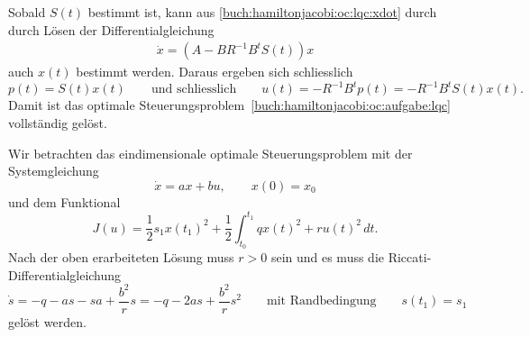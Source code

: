 Sobald $S(t)$ bestimmt ist, kann aus
\eqref{buch:hamiltonjacobi:oc:lqc:xdot}
durch durch Lösen der Differentialgleichung 
\begin{align*}
\dot{x} = (A-BR^{-1}B^tS(t)) x
\end{align*}
auch $x(t)$ bestimmt werden.
Daraus ergeben sich schliesslich
\[
p(t)
=
S(t)x(t)
\qquad
\text{und schliesslich}
\qquad
u(t)
=
-R^{-1}B^tp(t)=-R^{-1}B^tS(t)x(t).
\]
Damit ist das optimale
Steuerungsproblem~\ref{buch:hamiltonjacobi:oc:aufgabe:lqc}
vollständig gelöst.

\begin{beispiel}
Wir betrachten das eindimensionale optimale Steuerungsproblem mit
der Systemgleichung
\[
\dot x
=
ax + bu,
\qquad
x(0)=x_0
\]
und dem Funktional
\[
J(u)
=
\frac12 s_1x(t_1)^2
+
\frac12
\int_{t_0}^{t_1}
qx(t)^2 + ru(t)^2
\,dt.
\]
Nach der oben erarbeiteten Lösung muss $r>0$ sein und es muss
die Riccati-Differentialgleichung
\[
\dot{s}
=
-q-as -sa + \frac{b^2}rs
=
-q-2as+\frac{b^2}rs^2
\qquad\text{mit Randbedingung}\qquad
s(t_1)=s_1
\]
gelöst werden.

\end{beispiel}
